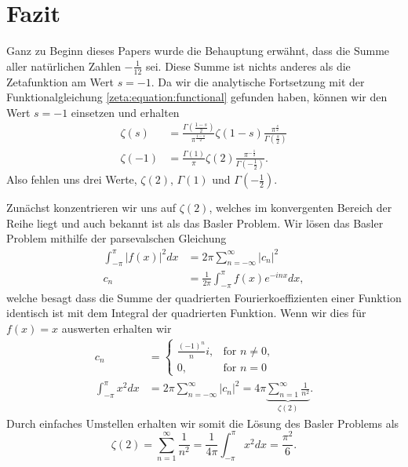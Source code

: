 \section{Fazit} \label{zeta:section:fazit}

Ganz zu Beginn dieses Papers wurde die Behauptung erwähnt, dass die Summe aller natürlichen Zahlen $-\frac{1}{12}$ sei.
Diese Summe ist nichts anderes als die Zetafunktion am Wert $s=-1$.
Da wir die analytische Fortsetzung mit der Funktionalgleichung \eqref{zeta:equation:functional} gefunden haben, können wir den Wert $s=-1$ einsetzen und erhalten
\begin{align*}
    \zeta(s)
    &=
    \frac{\Gamma \left( \frac{1-s}{2} \right)}{\pi^{\frac{1-s}{2}}}
    \zeta(1-s)
    \frac{\pi^{\frac{s}{2}}}{\Gamma \left( \frac{s}{2} \right)}
    \\
    \zeta(-1)
    &=
    \frac{\Gamma(1)}{\pi}
    \zeta(2)
    \frac{\pi^{-\frac{1}{2}}}{\Gamma \left( -\frac{1}{2} \right)}.
\end{align*}
Also fehlen uns drei Werte, $\zeta(2)$, $\Gamma(1)$ und $\Gamma\left(-\frac{1}{2}\right)$.

Zunächst konzentrieren wir uns auf $\zeta(2)$, welches im konvergenten Bereich der Reihe liegt und auch bekannt ist als das Basler Problem.
Wir lösen das Basler Problem \cite{zeta:online:basel} mithilfe der parsevalschen Gleichung \cite{zeta:online:pars}
\begin{align}
    \int_{-\pi}^{\pi} |f(x)|^2 dx
    &=
    2\pi \sum_{n=-\infty}^{\infty} |c_n|^2 \\
    c_n
    &=
    \frac{1}{2\pi}
    \int_{-\pi}^{\pi}f(x)e^{-inx} dx,
\end{align}
welche besagt dass die Summe der quadrierten Fourierkoeffizienten einer Funktion identisch ist mit dem Integral der quadrierten Funktion.
Wenn wir dies für $f(x) = x$ auswerten erhalten wir
\begin{align}
    c_n
    &=
    \begin{cases}
        \frac{(-1)^n}{n} i, & \text{for } n\neq0, \\
        0, & \text{for } n=0
    \end{cases}
    \\
    \int_{-\pi}^{\pi} x^2 dx
    &=
    2\pi \sum_{n=-\infty}^{\infty} |c_n|^2
    =
    4\pi \underbrace{\sum_{n=1}^{\infty} \frac{1}{n^2}}_{\zeta(2)}.
\end{align}
Durch einfaches Umstellen erhalten wir somit die Lösung des Basler Problems als
\begin{equation}
    \zeta(2) = \sum_{n=1}^{\infty} \frac{1}{n^2} = \frac{1}{4\pi}
    \int_{-\pi}^{\pi} x^2 dx
    = \frac{\pi^2}{6}.
\end{equation}

